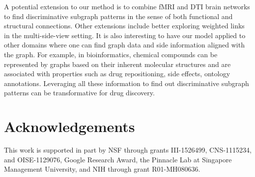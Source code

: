 \documentclass[conference]{IEEEtran}
\begin{document}
A potential extension to our method is to combine fMRI and DTI brain networks to find discriminative subgraph patterns in the sense of both functional and structural connections. Other extensions include better exploring weighted links in the multi-side-view setting. It is also interesting to have our model applied to other domains where one can find graph data and side information aligned with the graph. For example, in bioinformatics, chemical compounds can be represented by graphs based on their inherent molecular structures and are associated with properties such as drug repositioning, side effects, ontology annotations. Leveraging all these information to find out discriminative subgraph patterns can be transformative for drug discovery.

\section{Acknowledgements}
This work is supported in part by NSF through grants III-1526499, CNS-1115234, and OISE-1129076, Google Research Award, the Pinnacle Lab at Singapore Management University, and NIH through grant R01-MH080636.

\balance%
\end{document}
